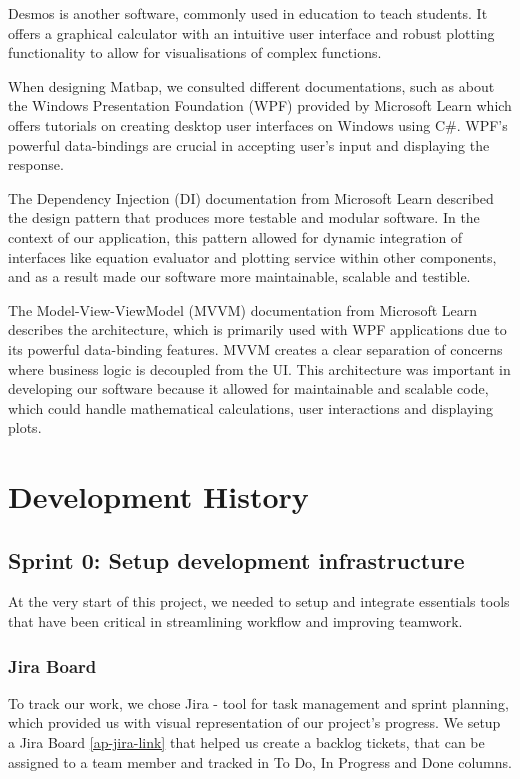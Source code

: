 \documentclass[a4paper, oneside, 11pt]{report}
\begin{document}
Desmos\cite{Desmos:2023} is another software, commonly used in education to teach students. It offers a graphical calculator with an intuitive user interface and robust plotting functionality to allow for visualisations of complex functions.

When designing Matbap, we consulted different documentations, such as about the Windows Presentation Foundation (WPF)\cite{WPF:2023} provided by Microsoft Learn which offers tutorials on creating desktop user interfaces on Windows using C\#. WPF’s powerful data-bindings are crucial in accepting user's input and displaying the response.

The Dependency Injection (DI) \cite{DI:2023} documentation from Microsoft Learn described the design pattern that produces more testable and modular software. In the context of our application, this pattern allowed for dynamic integration of interfaces like equation evaluator and plotting service within other components, and as a result made our software more maintainable, scalable and testible.

The Model-View-ViewModel (MVVM)\cite{MVVM:2022} documentation from Microsoft Learn describes the architecture, which is primarily used with WPF applications due to its powerful data-binding features. MVVM creates a clear separation of concerns where business logic is decoupled from the UI. This architecture was important in developing our software because it allowed for maintainable and scalable code, which could handle mathematical calculations, user interactions and displaying plots.


\chapter{Development History}\label{Chap:DevHist}

\section{Sprint 0: Setup development infrastructure}
At the very start of this project, we needed to setup and integrate essentials tools that have been critical in streamlining workflow and improving teamwork.

\subsection{Jira Board}
To track our work, we chose Jira\cite{Atlassian:JIRA} - tool for task management and sprint planning, which provided us with visual representation of our project's progress. We setup a Jira Board \ref{ap-jira-link} that helped us create a backlog tickets, that can be assigned to a team member and tracked in To Do, In Progress and Done columns.
\end{document}
